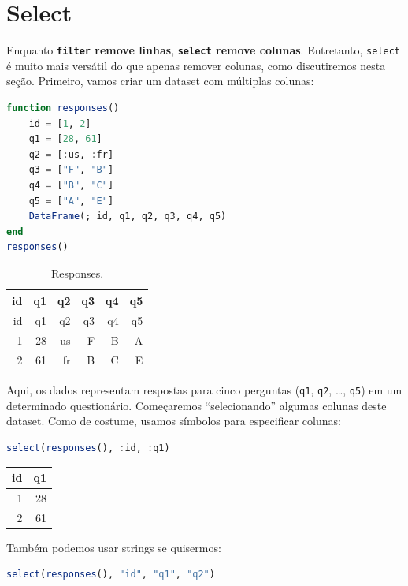 \documentclass[
  notoc %
]{tufte-book}
\newcommand{\passthrough}[1]{#1}
\begin{document}
\hypertarget{sec:select}{%
\section{Select}\label{sec:select}}

Enquanto \textbf{\passthrough{\lstinline!filter!} remove linhas},
\textbf{\passthrough{\lstinline!select!} remove colunas}. Entretanto,
\passthrough{\lstinline!select!} é muito mais versátil do que apenas
remover colunas, como discutiremos nesta seção. Primeiro, vamos criar um
dataset com múltiplas colunas:

\begin{lstlisting}[language=Julia]
function responses()
    id = [1, 2]
    q1 = [28, 61]
    q2 = [:us, :fr]
    q3 = ["F", "B"]
    q4 = ["B", "C"]
    q5 = ["A", "E"]
    DataFrame(; id, q1, q2, q3, q4, q5)
end
responses()
\end{lstlisting}

\hypertarget{tbl:responses}{}
\begin{longtable}[]{@{}rrrrrr@{}}
\caption{\label{tbl:responses}Responses.}\tabularnewline
\toprule
id & q1 & q2 & q3 & q4 & q5 \\
\midrule
\endfirsthead
\toprule
id & q1 & q2 & q3 & q4 & q5 \\
\midrule
\endhead
1 & 28 & us & F & B & A \\
2 & 61 & fr & B & C & E \\
\bottomrule
\end{longtable}

Aqui, os dados representam respostas para cinco perguntas
(\passthrough{\lstinline!q1!}, \passthrough{\lstinline!q2!}, \ldots,
\passthrough{\lstinline!q5!}) em um determinado questionário.
Começaremos ``selecionando'' algumas colunas deste dataset. Como de
costume, usamos símbolos para especificar colunas:

\begin{lstlisting}[language=Julia]
select(responses(), :id, :q1)
\end{lstlisting}

\begin{longtable}[]{@{}rr@{}}
\toprule
id & q1 \\
\midrule
\endhead
1 & 28 \\
2 & 61 \\
\bottomrule
\end{longtable}

Também podemos usar strings se quisermos:

\begin{lstlisting}[language=Julia]
select(responses(), "id", "q1", "q2")
\end{lstlisting}
\end{document}

